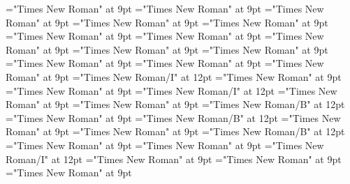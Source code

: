 \documentclass[gps1,twoside]{article}
\begin{document}
\font\headwordvariantformentrybackrefvariantformentrybackrefsentrybefore="Times New Roman" at 9pt
\font\owningentrysummarydefinitionvariantformentrybackrefvariantformentrybackrefsentrybefore="Times New Roman" at 9pt
\font\spanowningentrysummarydefinitionvariantformentrybackrefvariantformentrybackrefsentrylastchildafter="Times New Roman" at 9pt
\font\etymologyentrybefore="Times New Roman" at 9pt
\font\etymologyentryafter="Times New Roman" at 9pt
\font\formetymologyentrybefore="Times New Roman" at 9pt
\font\spanformetymologyentrylastchildafter="Times New Roman" at 9pt
\font\glossetymologyentrybefore="Times New Roman" at 9pt
\font\spanglossetymologyentrylastchildafter="Times New Roman" at 9pt
\font\commentetymologyentrybefore="Times New Roman" at 9pt
\font\spancommentetymologyentrylastchildafter="Times New Roman" at 9pt
\font\minimallexreferencesentrybefore="Times New Roman" at 9pt
\font\minimallexreferencesentryafter="Times New Roman" at 9pt
\font\spanenownertypeabbreviationminimallexreferenceminimallexreferencesentry="Times New Roman/I" at 12pt
\font\ownertypeabbreviationminimallexreferenceminimallexreferencesentrybefore="Times New Roman" at 9pt
\font\spanownertypeabbreviationminimallexreferenceminimallexreferencesentrylastchildafter="Times New Roman" at 9pt
\font\spanownertypeabbreviationminimallexreferenceminimallexreferencesentry="Times New Roman/I" at 12pt
\font\configtargetconfigtargetconfigtargetsminimallexreferenceminimallexreferencesentrybefore="Times New Roman" at 9pt
\font\configtargetsminimallexreferenceminimallexreferencesentryafter="Times New Roman" at 9pt
\font\spanbzhheadwordconfigtargetconfigtargetsminimallexreferenceminimallexreferencesentry="Times New Roman/B" at 12pt
\font\headwordconfigtargetconfigtargetsminimallexreferenceminimallexreferencesentrybefore="Times New Roman" at 9pt
\font\spanheadwordconfigtargetconfigtargetsminimallexreferenceminimallexreferencesentry="Times New Roman/B" at 12pt
\font\spansensecontentsensesentrybefore="Times New Roman" at 9pt
\font\sensesentryafter="Times New Roman" at 9pt
\font\sensenumbersensecontentsensesentry="Times New Roman/B" at 12pt
\font\sensenumbersensecontentsensesentryafter="Times New Roman" at 9pt
\font\morphosyntaxanalysissharedgrammaticalinfosensesentryafter="Times New Roman" at 9pt
\font\morphosyntaxanalysissharedgrammaticalinfosensesentry="Times New Roman/I" at 12pt
\font\partofspeechmorphosyntaxanalysissharedgrammaticalinfosensesentrybefore="Times New Roman" at 9pt
\font\spanpartofspeechmorphosyntaxanalysissharedgrammaticalinfosensesentrylastchildafter="Times New Roman" at 9pt
\font\slotsmorphosyntaxanalysissharedgrammaticalinfosensesentrybefore="Times New Roman" at 9pt
\end{document}
